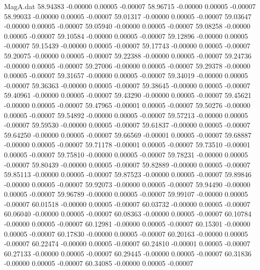 \begin{filecontents}{MagA.dat}
  58.94383   -0.00000    0.00005   -0.00007
  58.96715   -0.00000    0.00005   -0.00007
  58.99033   -0.00000    0.00005   -0.00007
  59.01317   -0.00000    0.00005   -0.00007
  59.03647   -0.00000    0.00005   -0.00007
  59.05940   -0.00000    0.00005   -0.00007
  59.08258   -0.00000    0.00005   -0.00007
  59.10584   -0.00000    0.00005   -0.00007
  59.12896   -0.00000    0.00005   -0.00007
  59.15439   -0.00000    0.00005   -0.00007
  59.17743   -0.00000    0.00005   -0.00007
  59.20075   -0.00000    0.00005   -0.00007
  59.22388   -0.00000    0.00005   -0.00007
  59.24736   -0.00000    0.00005   -0.00007
  59.27006   -0.00000    0.00005   -0.00007
  59.29378   -0.00000    0.00005   -0.00007
  59.31657   -0.00000    0.00005   -0.00007
  59.34019   -0.00000    0.00005   -0.00007
  59.36363   -0.00000    0.00005   -0.00007
  59.38645   -0.00000    0.00005   -0.00007
  59.40961   -0.00000    0.00005   -0.00007
  59.43290   -0.00000    0.00005   -0.00007
  59.45621   -0.00000    0.00005   -0.00007
  59.47965   -0.00001    0.00005   -0.00007
  59.50276   -0.00000    0.00005   -0.00007
  59.54892   -0.00000    0.00005   -0.00007
  59.57213   -0.00000    0.00005   -0.00007
  59.59530   -0.00000    0.00005   -0.00007
  59.61837   -0.00000    0.00005   -0.00007
  59.64250   -0.00000    0.00005   -0.00007
  59.66569   -0.00001    0.00005   -0.00007
  59.68887   -0.00000    0.00005   -0.00007
  59.71178   -0.00001    0.00005   -0.00007
  59.73510   -0.00001    0.00005   -0.00007
  59.75810   -0.00000    0.00005   -0.00007
  59.78231   -0.00000    0.00005   -0.00007
  59.80439   -0.00000    0.00005   -0.00007
  59.82889   -0.00000    0.00005   -0.00007
  59.85113   -0.00000    0.00005   -0.00007
  59.87523   -0.00000    0.00005   -0.00007
  59.89846   -0.00000    0.00005   -0.00007
  59.92073   -0.00000    0.00005   -0.00007
  59.94490   -0.00000    0.00005   -0.00007
  59.96789   -0.00000    0.00005   -0.00007
  59.99107   -0.00000    0.00005   -0.00007
  60.01518   -0.00000    0.00005   -0.00007
  60.03732   -0.00000    0.00005   -0.00007
  60.06040   -0.00000    0.00005   -0.00007
  60.08363   -0.00000    0.00005   -0.00007
  60.10784   -0.00000    0.00005   -0.00007
  60.12981   -0.00000    0.00005   -0.00007
  60.15301   -0.00000    0.00005   -0.00007
  60.17830   -0.00000    0.00005   -0.00007
  60.20163   -0.00000    0.00005   -0.00007
  60.22474   -0.00000    0.00005   -0.00007
  60.24810   -0.00001    0.00005   -0.00007
  60.27133   -0.00000    0.00005   -0.00007
  60.29445   -0.00000    0.00005   -0.00007
  60.31836   -0.00000    0.00005   -0.00007
  60.34085   -0.00000    0.00005   -0.00007

\end{filecontents}
